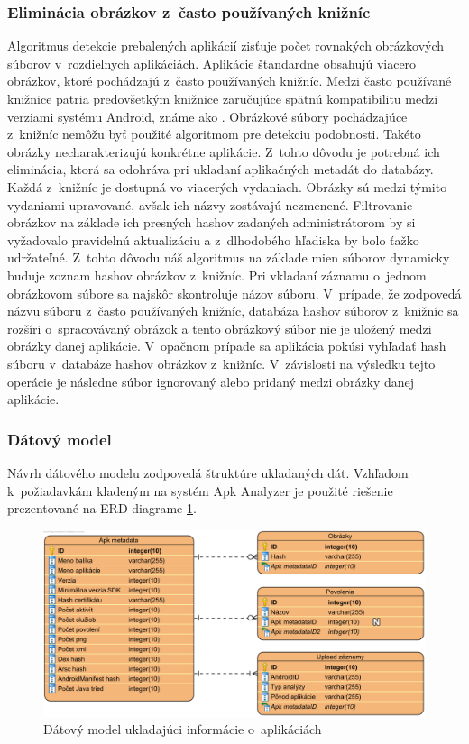 \subsubsection{\textbf{Eliminácia obrázkov z~často používaných knižníc}}
\label{sec:eliminacia-kniznic}
Algoritmus detekcie prebalených aplikácií zisťuje počet rovnakých obrázkových súborov v~rozdielnych aplikáciách. Aplikácie štandardne obsahujú viacero obrázkov, ktoré pochádzajú z~často používaných knižníc. Medzi často používané knižnice patria predovšetkým knižnice zaručujúce spätnú kompatibilitu medzi verziami systému Android, známe ako . Obrázkové súbory pochádzajúce z~knižníc nemôžu byť použité algoritmom pre detekciu podobnosti. Takéto obrázky necharakterizujú konkrétne aplikácie. Z~tohto dôvodu je potrebná ich eliminácia, ktorá sa odohráva pri ukladaní aplikačných metadát do databázy. Každá z~knižníc je dostupná vo viacerých vydaniach. Obrázky sú medzi týmito vydaniami upravované, avšak ich názvy zostávajú nezmenené. Filtrovanie obrázkov na základe ich presných hashov zadaných administrátorom by si vyžadovalo pravidelnú aktualizáciu a z~dlhodobého hľadiska by bolo ťažko udržateľné. Z~tohto dôvodu náš algoritmus na základe mien súborov dynamicky buduje zoznam hashov obrázkov z~knižníc. Pri vkladaní záznamu o~jednom obrázkovom súbore sa najskôr skontroluje názov súboru. V~prípade, že zodpovedá názvu súboru z~často používaných knižníc, databáza hashov súborov z~knižníc sa rozšíri o~spracovávaný obrázok a tento obrázkový súbor nie je uložený medzi obrázky danej aplikácie. V~opačnom prípade sa aplikácia pokúsi vyhľadať hash súboru v~databáze hashov obrázkov z~knižníc. V~závislosti na výsledku tejto operácie je následne súbor ignorovaný alebo pridaný medzi obrázky danej aplikácie.

\subsubsection{\textbf{Dátový model}}
Návrh dátového modelu zodpovedá štruktúre ukladaných dát. Vzhľadom k~požiadavkám kladeným na systém Apk Analyzer je použité riešenie prezentované na ERD diagrame \ref{fig:detectionDbErd}. 

\begin{figure}[htb]
  \begin{center}
    \includegraphics[width=130mm]{images/detection-db-erd.png}
  \end{center}
  \caption{Dátový model ukladajúci informácie o~aplikáciách}
  \label{fig:detectionDbErd}
\end{figure}

